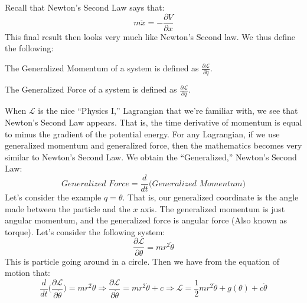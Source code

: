 \documentclass[crop=false,class=book,oneside]{standalone}
\begin{document}
        Recall that Newton's Second Law says that:
        \begin{equation*}
            m\ddot{x}=-\frac{\partial{V}}{\partial{x}}    
        \end{equation*}
        This final result then looks very
        much like Newton's Second law.
        We thus define the following:
        \begin{definition}
            The Generalized Momentum of a system is
            defined as $\frac{\partial\mathcal{L}}{\partial\dot{q}}$.
        \end{definition}
        \begin{definition}
            The Generalized Force of a system is defined as
            $\frac{\partial\mathcal{L}}{\partial q}$.
        \end{definition}
        When $\mathcal{L}$ is the nice ``Physics I,''
        Lagrangian that we're familiar with,
        we see that Newton's Second Law appears.
        That is, the time derivative of momentum is equal
        to minus the gradient of the potential energy.
        For any Lagrangian, if we use generalized momentum
        and generalized force, then the mathematics becomes
        very similar to Newton's Second Law.
        We obtain the ``Generalized,'' Newton's Second Law:
        \begin{equation*}
            \textit{Generalized Force}
            =
            \frac{d}{dt}\big(
                \textit{Generalized Momentum}
            \big)
        \end{equation*}
        Let's consider the example $q=\theta$.
        That is, our generalized coordinate is the angle
        made between the particle and the $x$ axis.
        The generalized momentum is just angular momentum,
        and the generalized force is angular force
        (Also known as torque). Let's consider the
        following system:
        \begin{equation*}
            \frac{\partial\mathcal{L}}{\partial\theta}
            =mr^{2}\ddot{\theta}
        \end{equation*}
        This is particle going around in a circle.
        Then we have from the equation of motion that:
        \begin{equation*}
            \frac{d}{dt}\big(
                \frac{\partial\mathcal{L}}{\partial\dot{\theta}}
            \big)
            =mr^{2}\ddot{\theta}
            \Rightarrow
            \frac{\partial\mathcal{L}}{\partial\dot{\theta}}
            =mr^{2}\dot{\theta}+c
            \Rightarrow
            \mathcal{L}
            =\frac{1}{2}mr^2\dot{\theta}+g(\theta)+c\dot{\theta}
        \end{equation*}
\end{document}

